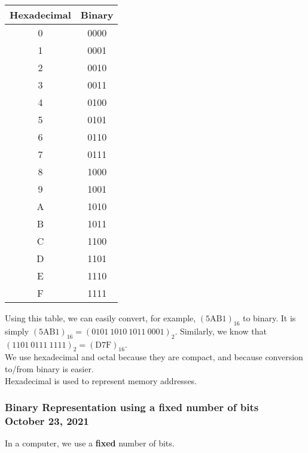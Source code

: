 \documentclass[]{article}
\begin{document}
\begin{center}
	\begin{table}[h]\centering
		\begin{tabular}{|c|c|}
			\hline
			Hexadecimal & Binary \\ \hline
			0           & 0000   \\
			1           & 0001   \\
			2           & 0010   \\
			3           & 0011   \\
			4           & 0100   \\
			5           & 0101   \\
			6           & 0110   \\
			7           & 0111   \\
			8           & 1000   \\
			9           & 1001   \\
			A           & 1010   \\
			B           & 1011   \\
			C           & 1100   \\
			D           & 1101   \\
			E           & 1110   \\
			F           & 1111   \\ \hline
		\end{tabular}
	\end{table}
\end{center}

Using this table, we can easily convert, for example, $(\mathrm{5AB1})_{16}$ to binary. It is simply $(\mathrm{5AB1})_{16} = (0101~1010~1011~0001)_2$. Similarly, we know that $(1101~0111~1111)_2 = (\mathrm{D7F})_{16}$.\\

We use hexadecimal and octal because they are compact, and because conversion to/from binary is easier.\\

Hexadecimal is used to represent memory addresses. \\


\subsubsection{Binary Representation using a fixed number of bits\\ {\normalfont October 23, 2021}}
\bigbreak

In a computer, we use a \textbf{fixed} number of bits.\\
\end{document}
